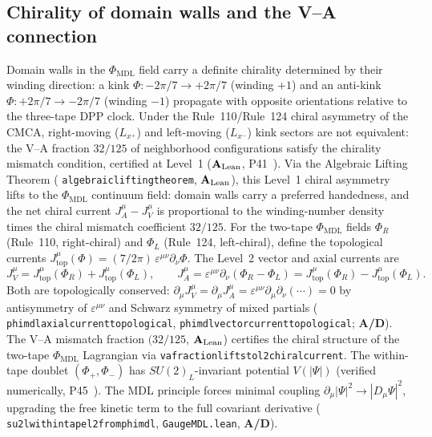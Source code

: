 \documentclass[11pt]{article}
\theoremstyle{remark}
\newcommand{\PHIMDL}{\Phi_{\mathrm{MDL}}}
\newcommand{\lean}[1]{%
  \penalty-100
  \begingroup\def\_{\textunderscore\allowbreak}\texttt{#1}\endgroup}
\newcommand{\CatAL}{\ensuremath{\textbf{A}_{\rm Lean}}}
\newcommand{\CatAD}{\textbf{A/D}}
\begin{document}
\subsection{Chirality of domain walls and the V--A connection}
\label{ssec:chirality_va}

Domain walls in the $\PHIMDL$ field carry a definite chirality determined by their
winding direction: a kink $\Phi: -2\pi/7 \to +2\pi/7$ (winding $+1$) and an
anti-kink $\Phi: +2\pi/7 \to -2\pi/7$ (winding $-1$) propagate with opposite
orientations relative to the three-tape DPP clock.  Under the Rule~110/Rule~124
chiral asymmetry of the CMCA, right-moving ($L_{x^+}$) and left-moving ($L_{x^-}$)
kink sectors are not equivalent: the V--A fraction $32/125$ of neighborhood
configurations satisfy the chirality mismatch condition, certified at Level~1
(\CatAL, P41~\cite{SpivackCMCA}).  Via the Algebraic Lifting Theorem
(\lean{algebraic\_lifting\_theorem}, \CatAL), this Level~1 chiral asymmetry lifts
to the $\PHIMDL$ continuum field: domain walls carry a preferred handedness, and
the net chiral current $J^\mu_A - J^\mu_V$ is proportional to the winding-number
density times the chiral mismatch coefficient $32/125$.
For the two-tape $\PHIMDL$ fields $\Phi_R$ (Rule~110, right-chiral) and
$\Phi_L$ (Rule~124, left-chiral), define the topological currents
$J^\mu_{\mathrm{top}}(\Phi) = (7/2\pi)\,\varepsilon^{\mu\nu}\partial_\nu\Phi$.
The Level~2 vector and axial currents are
\begin{equation}
  J^\mu_V = J^\mu_{\mathrm{top}}(\Phi_R) + J^\mu_{\mathrm{top}}(\Phi_L),
  \qquad
  J^\mu_A = \varepsilon^{\mu\nu}\partial_\nu(\Phi_R - \Phi_L)
  = J^\mu_{\mathrm{top}}(\Phi_R) - J^\mu_{\mathrm{top}}(\Phi_L).
\end{equation}
Both are topologically conserved:
$\partial_\mu J^\mu_V = \partial_\mu J^\mu_A = \varepsilon^{\mu\nu}\partial_\mu\partial_\nu(\cdots)=0$
by antisymmetry of $\varepsilon^{\mu\nu}$ and Schwarz symmetry of mixed partials
(\lean{phimdl\_axial\_current\_topological},
\lean{phimdl\_vector\_current\_topological}; \CatAD).
The V--A mismatch fraction $(32/125$, \CatAL) certifies the chiral structure of the
two-tape $\PHIMDL$ Lagrangian via
\lean{va\_fraction\_lifts\_to\_l2\_chiral\_current}.
The within-tape doublet $(\Phi_+, \Phi_-)$ has $SU(2)_L$-invariant potential
$V(|\Psi|)$ (verified numerically, P45~\cite{SpivackThreeTapeCMCA}).
The MDL principle forces minimal coupling
$\partial_\mu |\Psi|^2 \to |D_\mu\Psi|^2$, upgrading the free kinetic term to the
full covariant derivative
(\lean{su2l\_within\_tape\_l2\_from\_phimdl}, \texttt{GaugeMDL.lean}, \CatAD{}).
\end{document}

